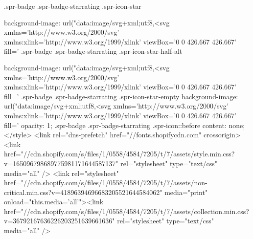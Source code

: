 .spr-badge .spr-badge-starrating .spr-icon-star { background-image: url("data:image/svg+xml;utf8,<svg xmlns='http://www.w3.org/2000/svg' xmlns:xlink='http://www.w3.org/1999/xlink' viewBox='0 0 426.667 426.667' fill='%
.spr-badge .spr-badge-starrating .spr-icon-star-half-alt { background-image: url("data:image/svg+xml;utf8,<svg xmlns='http://www.w3.org/2000/svg' xmlns:xlink='http://www.w3.org/1999/xlink' viewBox='0 0 426.667 426.667' fill='%
.spr-badge .spr-badge-starrating .spr-icon-star-empty {
  background-image: url("data:image/svg+xml;utf8,<svg xmlns='http://www.w3.org/2000/svg' xmlns:xlink='http://www.w3.org/1999/xlink' viewBox='0 0 426.667 426.667' fill='%
  opacity: 1;
}
.spr-badge .spr-badge-starrating .spr-icon::before { content: none; }</style>
  <link rel="dns-prefetch" href="//fonts.shopifycdn.com" crossorigin><link href="//cdn.shopify.com/s/files/1/0558/4584/7205/t/7/assets/style.min.css?v=165096798689775981171644587137" rel="stylesheet" type="text/css" media="all" />
<link rel="stylesheet" href="//cdn.shopify.com/s/files/1/0558/4584/7205/t/7/assets/non-critical.min.css?v=41896394696683205521644584062" media="print" onload="this.media='all'"><link href="//cdn.shopify.com/s/files/1/0558/4584/7205/t/7/assets/collection.min.css?v=36792167636226203251639661636" rel="stylesheet" type="text/css" media="all" />

}}
